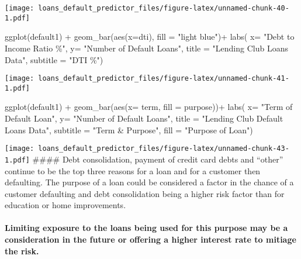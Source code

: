\documentclass[
]{article}
\newenvironment{Shaded}{\begin{snugshade}}{\end{snugshade}}
\newcommand{\AttributeTok}[1]{\textcolor[rgb]{0.77,0.63,0.00}{#1}}
\newcommand{\FunctionTok}[1]{\textcolor[rgb]{0.00,0.00,0.00}{#1}}
\newcommand{\NormalTok}[1]{#1}
\newcommand{\SpecialCharTok}[1]{\textcolor[rgb]{0.00,0.00,0.00}{#1}}
\newcommand{\StringTok}[1]{\textcolor[rgb]{0.31,0.60,0.02}{#1}}
\begin{document}
\texttt{[image: loans\_default\_predictor\_files/figure-latex/unnamed-chunk-40-1.pdf]}

\begin{Shaded}
\begin{Highlighting}[]
\FunctionTok{ggplot}\NormalTok{(default1) }\SpecialCharTok{+}
  \FunctionTok{geom\_bar}\NormalTok{(}\FunctionTok{aes}\NormalTok{(}\AttributeTok{x=}\NormalTok{dti), }\AttributeTok{fill =} \StringTok{"light blue"}\NormalTok{)}\SpecialCharTok{+}
   \FunctionTok{labs}\NormalTok{( }\AttributeTok{x=} \StringTok{"Debt to Income Ratio \%"}\NormalTok{,}
        \AttributeTok{y=} \StringTok{"Number of Default Loans"}\NormalTok{,}
        \AttributeTok{title =} \StringTok{"Lending Club Loans Data"}\NormalTok{,}
        \AttributeTok{subtitle =} \StringTok{"DTI \%"}\NormalTok{)}
\end{Highlighting}
\end{Shaded}

\texttt{[image: loans\_default\_predictor\_files/figure-latex/unnamed-chunk-41-1.pdf]}

\begin{Shaded}
\begin{Highlighting}[]
\FunctionTok{ggplot}\NormalTok{(default1) }\SpecialCharTok{+}
  \FunctionTok{geom\_bar}\NormalTok{(}\FunctionTok{aes}\NormalTok{(}\AttributeTok{x=}\NormalTok{ term, }\AttributeTok{fill =}\NormalTok{ purpose))}\SpecialCharTok{+}
  \FunctionTok{labs}\NormalTok{( }\AttributeTok{x=} \StringTok{"Term of Default Loan"}\NormalTok{,}
        \AttributeTok{y=} \StringTok{"Number of Default Loans"}\NormalTok{,}
        \AttributeTok{title =} \StringTok{"Lending Club Default Loans Data"}\NormalTok{,}
        \AttributeTok{subtitle =} \StringTok{"Term \& Purpose"}\NormalTok{,}
        \AttributeTok{fill =} \StringTok{"Purpose of Loan"}\NormalTok{)}
\end{Highlighting}
\end{Shaded}

\texttt{[image: loans\_default\_predictor\_files/figure-latex/unnamed-chunk-43-1.pdf]}
\#\#\#\# Debt consolidation, payment of credit card debts and ``other''
continue to be the top three reasons for a loan and for a customer then
defaulting. The purpose of a loan could be considered a factor in the
chance of a customer defaulting and debt consolidation being a higher
risk factor than for education or home improvements.

\hypertarget{limiting-exposure-to-the-loans-being-used-for-this-purpose-may-be-a-consideration-in-the-future-or-offering-a-higher-interest-rate-to-mitiage-the-risk.}{%
\paragraph{Limiting exposure to the loans being used for this purpose
may be a consideration in the future or offering a higher interest rate
to mitiage the
risk.}\label{limiting-exposure-to-the-loans-being-used-for-this-purpose-may-be-a-consideration-in-the-future-or-offering-a-higher-interest-rate-to-mitiage-the-risk.}}
\end{document}
